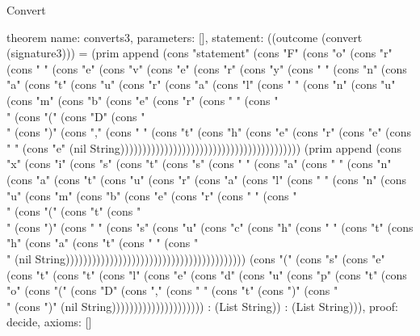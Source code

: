 \begin{lexlean}{Convert}
\begin{semanticmodule}
theorem{
  name: converts3,
  parameters: [],
  statement: ((outcome (convert (signature3))) = (prim append (cons "statement" (cons "F" (cons "o" (cons "r" (cons " " (cons "e" (cons "v" (cons "e" (cons "r" (cons "y" (cons " " (cons "n" (cons "a" (cons "t" (cons "u" (cons "r" (cons "a" (cons "l" (cons " " (cons "n" (cons "u" (cons "m" (cons "b" (cons "e" (cons "r" (cons " " (cons "\\" (cons "(" (cons "D" (cons "\\" (cons ")" (cons "," (cons " " (cons "t" (cons "h" (cons "e" (cons "r" (cons "e" (cons " " (cons "e" (nil String))))))))))))))))))))))))))))))))))))))))) (prim append (cons "x" (cons "i" (cons "s" (cons "t" (cons "s" (cons " " (cons "a" (cons " " (cons "n" (cons "a" (cons "t" (cons "u" (cons "r" (cons "a" (cons "l" (cons " " (cons "n" (cons "u" (cons "m" (cons "b" (cons "e" (cons "r" (cons " " (cons "\\" (cons "(" (cons "t" (cons "\\" (cons ")" (cons " " (cons "s" (cons "u" (cons "c" (cons "h" (cons " " (cons "t" (cons "h" (cons "a" (cons "t" (cons " " (cons "\\" (nil String))))))))))))))))))))))))))))))))))))))))) (cons "(" (cons "s" (cons "e" (cons "t" (cons "t" (cons "l" (cons "e" (cons "d" (cons "u" (cons "p" (cons "t" (cons "o" (cons "(" (cons "D" (cons "," (cons " " (cons "t" (cons ")" (cons "\\" (cons ")" (nil String))))))))))))))))))))) : (List String)) : (List String))),
  proof: decide{},
  axioms: []
}


\end{semanticmodule}
\end{lexlean}
